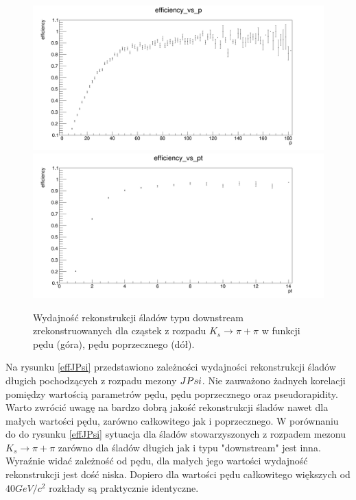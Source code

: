 \begin{figure}[H]
\includegraphics[scale=0.25]{rozdzial6/KsDD_p.png} \\
\includegraphics[scale=0.25]{rozdzial6/KsDD_pt.png} \\
\caption{Wydajność rekonstrukcji śladów typu downstream zrekonstruowanych dla cząstek z rozpadu $K_s \rightarrow \pi + \pi $  w funkcji pędu (góra), pędu poprzecznego (dół).}
\label{KsDD}
\end{figure}

Na rysunku \ref{effJPsi} przedstawiono zależności wydajności rekonstrukcji śladów długich pochodzących z rozpadu mezony $J\/Psi$.  Nie zauważono żadnych korelacji pomiędzy wartością parametrów pędu, pędu poprzecznego oraz pseudorapidity. Warto zwrócić uwagę na bardzo dobrą jakość rekonstrukcji śladów nawet dla małych wartości pędu, zarówno całkowitego jak i poprzecznego. W porównaniu do do rysunku \ref{effJPsi} sytuacja dla śladów stowarzyszonych z rozpadem mezonu $K_s \rightarrow \pi + \pi $ zarówno dla śladów długich jak i typu "downstream" jest inna. Wyraźnie widać zależność od pędu, dla małych jego wartości wydajność rekonstrukcji jest dość niska. Dopiero dla wartości pędu całkowitego większych od $40GeV/c^2$ rozkłady są praktycznie identyczne. 

